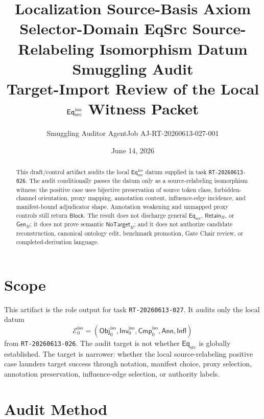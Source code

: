 \documentclass[11pt]{article}
\title{\textbf{Localization Source-Basis Axiom Selector-Domain EqSrc Source-Relabeling Isomorphism Datum Smuggling Audit}\\[0.35em]
\large Target-Import Review of the Local \(\EqIso\) Witness Packet}
\author{Smuggling Auditor AgentJob AJ-RT-20260613-027-001}
\date{June 14, 2026}
\newcommand{\Obj}{\mathsf{Obj}_{0}^{\mathrm{iso}}}
\newcommand{\Inv}{\mathsf{Inv}_{0}^{\mathrm{iso}}}
\newcommand{\Cmp}{\mathsf{Cmp}_{0}^{\mathrm{iso}}}
\newcommand{\EqSrc}{\mathsf{Eq}_{\mathrm{src}}}
\newcommand{\EqIso}{\mathsf{Eq}_{\mathrm{src}}^{\mathrm{iso}}}
\newcommand{\GenH}{\mathsf{Gen}_{H}}
\newcommand{\RetainH}{\mathsf{Retain}_{H}}
\newcommand{\NoTargetH}{\mathsf{NoTarget}_{H}}
\newcommand{\Annot}{\mathsf{Ann}}
\newcommand{\Influence}{\mathsf{Infl}}
\newcommand{\Block}{\mathsf{Block}}
\begin{document}
\maketitle

\begin{abstract}
This draft/control artifact audits the local \(\EqIso\) datum supplied in
task \texttt{RT-20260613-026}. The audit conditionally passes the datum
only as a source-relabeling isomorphism witness: the positive case uses
bijective preservation of source token class, forbidden-channel
orientation, proxy mapping, annotation content, influence-edge incidence,
and manifest-bound adjudicator shape. Annotation weakening and unmapped
proxy controls still return \(\Block\). The result does not discharge
general \(\EqSrc\), \(\RetainH\), or \(\GenH\); it does not prove semantic
\(\NoTargetH\); and it does not authorize candidate reconstruction,
canonical ontology edit, benchmark promotion, Gate Chair review, or
completed-derivation language.
\end{abstract}

\section{Scope}

This artifact is the role output for task \texttt{RT-20260613-027}. It
audits only the local datum
\[
    \mathcal{E}_{0}^{\mathrm{iso}}=(\Obj,\Inv,\Cmp,\Annot,\Influence)
\]
from \texttt{RT-20260613-026}. The audit target is not whether
\(\EqSrc\) is globally established. The target is narrower: whether the
local source-relabeling positive case launders target success through
notation, manifest choice, proxy selection, annotation preservation,
influence-edge selection, or authority labels.

\section{Audit Method}
\end{document}
